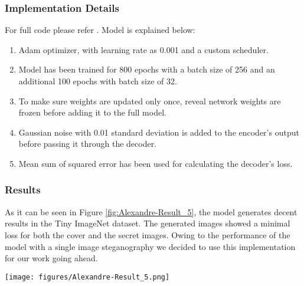 \documentclass{article}
\begin{document}
\subsubsection{Implementation Details}
For full code please refer \href{https://colab.research.google.com/drive/1_-k_0NpGouhHurBTZyF-jiTruUHJ2K3Y?usp=sharing}{\color{blue}{here}}.
Model is explained below:
\begin{enumerate}
    \item Adam optimizer, with learning rate as 0.001 and a custom scheduler.
    \item Model has been trained for 800 epochs with a batch size of 256 and an additional 100 epochs with batch size of 32. 
    \item To make sure weights are updated only once, reveal network weights are frozen before adding it to the full model.
    \item Gaussian noise with 0.01 standard deviation is added to the encoder's output before passing it through the decoder. 
    \item Mean sum of squared error has been used for calculating the decoder's loss.
\end{enumerate}

\subsubsection{Results}
As it can be seen in Figure \ref{fig:Alexandre-Result_5}, the model generates decent results in the Tiny ImageNet dataset. The generated images showed a minimal loss for both the cover and the secret images. Owing to the performance of the model with a single image steganography we decided to use this implementation for our work going ahead.


\begin{figure*}[t]
\vskip 0.2in
\begin{center}
\centerline{\texttt{[image: figures/Alexandre-Result\_5.png]}}
\caption{The results showing the cover and hidden images before and after running the model for 900 epochs. Left to Right Columns are: Cover Image, Secret Image, Encoded Cover Image, Decoded Secret Image, Diff Cover Image, Diff Secret Image. We can notice than the differences between the original cover and the encoded cover is almost going null. Same with the original secret and the decoded secret image.}
\label{fig:Alexandre-Result_5}
\end{center}
\vskip -0.4in
\end{figure*}
\end{document}
